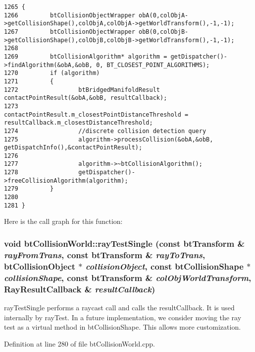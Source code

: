 \begin{Code}\begin{verbatim}1265 {
1266         btCollisionObjectWrapper obA(0,colObjA->getCollisionShape(),colObjA,colObjA->getWorldTransform(),-1,-1);
1267         btCollisionObjectWrapper obB(0,colObjB->getCollisionShape(),colObjB,colObjB->getWorldTransform(),-1,-1);
1268 
1269         btCollisionAlgorithm* algorithm = getDispatcher()->findAlgorithm(&obA,&obB, 0, BT_CLOSEST_POINT_ALGORITHMS);
1270         if (algorithm)
1271         {
1272                 btBridgedManifoldResult contactPointResult(&obA,&obB, resultCallback);
1273                 contactPointResult.m_closestPointDistanceThreshold = resultCallback.m_closestDistanceThreshold;
1274                 //discrete collision detection query
1275                 algorithm->processCollision(&obA,&obB, getDispatchInfo(),&contactPointResult);
1276 
1277                 algorithm->~btCollisionAlgorithm();
1278                 getDispatcher()->freeCollisionAlgorithm(algorithm);
1279         }
1280 
1281 }
\end{verbatim}
\end{Code}




Here is the call graph for this function:\hypertarget{classbt_collision_world_ca2a9413508b4a2449fe83ff93ea564e}{
\subsubsection[rayTestSingle]{\setlength{\rightskip}{0pt plus 5cm}void btCollisionWorld::rayTestSingle (const btTransform \& {\em rayFromTrans}, \/  const btTransform \& {\em rayToTrans}, \/  btCollisionObject $\ast$ {\em collisionObject}, \/  const btCollisionShape $\ast$ {\em collisionShape}, \/  const btTransform \& {\em colObjWorldTransform}, \/  {\bf RayResultCallback} \& {\em resultCallback})}}
\label{classbt_collision_world_ca2a9413508b4a2449fe83ff93ea564e}


rayTestSingle performs a raycast call and calls the resultCallback. It is used internally by rayTest. In a future implementation, we consider moving the ray test as a virtual method in btCollisionShape. This allows more customization. 

Definition at line 280 of file btCollisionWorld.cpp.

